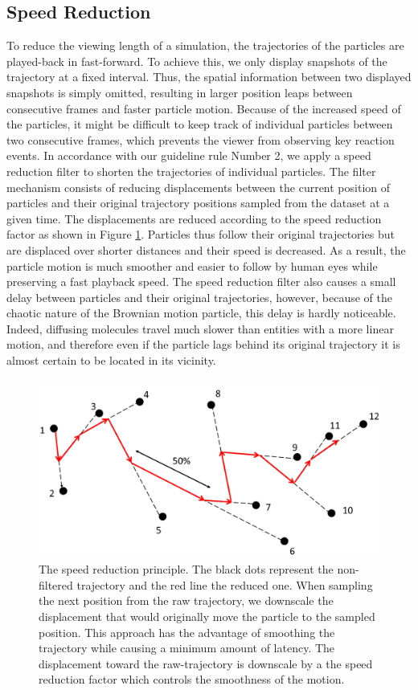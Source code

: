 \subsection{Speed Reduction}

To reduce the viewing length of a simulation, the trajectories of the particles are played-back in fast-forward.
To achieve this, we only display snapshots of the trajectory at a fixed interval.
Thus, the spatial information between two displayed snapshots is simply omitted, resulting in larger position leaps between consecutive frames and faster particle motion.
Because of the increased speed of the particles, it might be difficult to keep track of individual particles between two consecutive frames, which prevents the viewer from observing key reaction events.
In accordance with our guideline rule Number 2, we apply a speed reduction filter to shorten the trajectories of individual particles.
The filter mechanism consists of reducing displacements between the current position of particles and their original trajectory positions sampled from the dataset at a given time.
The displacements are reduced according to the speed reduction factor as shown in Figure \ref{fig:speedreduction}.
Particles thus follow their original trajectories but are displaced over shorter distances and their speed is decreased.
As a result, the particle motion is much smoother and easier to follow by human eyes while preserving a fast playback speed.
The speed reduction filter also causes a small delay between particles and their original trajectories, however, because of the chaotic nature of the Brownian motion particle, this delay is hardly noticeable.
Indeed, diffusing molecules travel much slower than entities with a more linear motion, and therefore even if the particle lags behind its original trajectory it is almost certain to be located in its vicinity.

\begin{figure}
	\centering
	\includegraphics[width=0.5\linewidth]{graphics/SpeedReduction}
	\caption{The speed reduction principle. The black dots represent the non-filtered trajectory and the red line the reduced one. When sampling the next position from the raw trajectory, we downscale the displacement that would originally move the particle to the sampled position. This approach has the advantage of smoothing the trajectory while causing a minimum amount of latency. The displacement toward the raw-trajectory is downscale by a the speed reduction factor which controls the smoothness of the motion.}
	\label{fig:speedreduction}
\end{figure}

